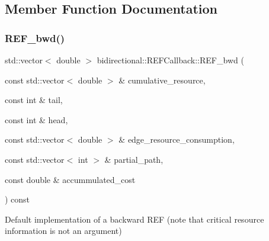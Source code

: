 \subsection{Member Function Documentation}
\mbox{\label{classbidirectional_1_1REFCallback_a829eafdc1f944c05a38835ec3a61abb7}} 
\subsubsection{\texorpdfstring{R\+E\+F\+\_\+bwd()}{REF\_bwd()}}
{\footnotesize\ttfamily std\+::vector$<$ double $>$ bidirectional\+::\+R\+E\+F\+Callback\+::\+R\+E\+F\+\_\+bwd (\begin{DoxyParamCaption}\item[{const std\+::vector$<$ double $>$ \&}]{cumulative\+\_\+resource,  }\item[{const int \&}]{tail,  }\item[{const int \&}]{head,  }\item[{const std\+::vector$<$ double $>$ \&}]{edge\+\_\+resource\+\_\+consumption,  }\item[{const std\+::vector$<$ int $>$ \&}]{partial\+\_\+path,  }\item[{const double \&}]{accummulated\+\_\+cost }\end{DoxyParamCaption}) const\hspace{0.3cm}{\ttfamily [virtual]}}

Default implementation of a backward R\+EF (note that critical resource information is not an argument) \mbox{\label{classbidirectional_1_1REFCallback_a08774ede77624500d8d8dbd0f3765610}} 
